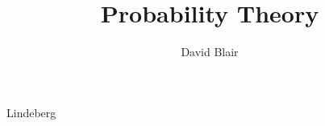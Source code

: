 \documentclass{amsbook}
\theoremstyle{definition}
\theoremstyle{remark}
\begin{document}
\frontmatter
\title{Probability Theory}
\author{David Blair}
\maketitle

\mainmatter

\tableofcontents











 {Lindeberg}






































\end{document}
